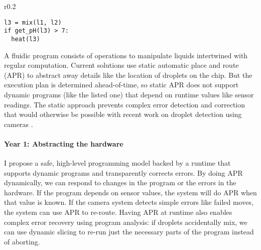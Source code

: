 \documentclass[12pt]{article}
\begin{document}
\begin{wrapfigure}{r}{0.2\linewidth}
  \footnotesize
  \vspace{-3em}
\begin{verbatim}
l3 = mix(l1, l2)
if get_pH(l3) > 7:
  heat(l3)
\end{verbatim}
  \vspace{-2em}
\end{wrapfigure}

A fluidic program consists of operations to manipulate liquids intertwined with regular computation.
Current solutions use static automatic place and route (APR) to abstract away details like the location of droplets on the chip.
But the execution plan is determined ahead-of-time, so
static APR does not support dynamic programs (like the listed one) that depend on runtime values like sensor readings.
The static approach prevents complex error detection and correction that would otherwise be possible with recent work on droplet detection using cameras \cite{dmf-vision}.



\paragraph{Year 1: Abstracting the hardware}
I propose a safe, high-level programming model backed by a runtime that supports dynamic programs and transparently corrects errors.
By doing APR dynamically, we can respond to changes in the program or the errors in the hardware.
If the program depends on sensor values, the system will do APR when that value is known.
If the camera system detects simple errors like failed moves, the system can use APR to re-route.
Having APR at runtime also enables complex error recovery using program analysis: if droplets accidentally mix, we can use dynamic slicing to re-run just the necessary parts of the program instead of aborting.

\end{document}
